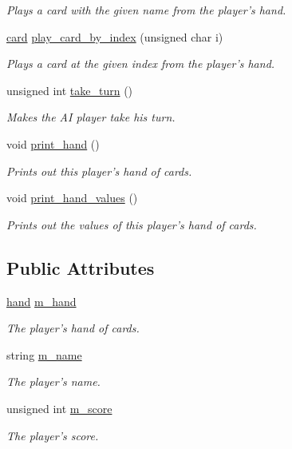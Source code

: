 \begin{DoxyCompactItemize}
\begin{DoxyCompactList}\small\item\em \-Plays a card with the given name from the player's hand. \end{DoxyCompactList}\item 
\hyperlink{uno__card_8h_ab16a632e2e3f1f154cce75648902eb83}{card} \hyperlink{class_uno___player_abe1a86f4792fa9e703ffeb28e453160f}{play\-\_\-card\-\_\-by\-\_\-index} (unsigned char i)
\begin{DoxyCompactList}\small\item\em \-Plays a card at the given index from the player's hand. \end{DoxyCompactList}\item 
unsigned int \hyperlink{class_uno___player_a31f9f272c9a427ea3b9e8dc7120fadac}{take\-\_\-turn} ()
\begin{DoxyCompactList}\small\item\em \-Makes the \-A\-I player take his turn. \end{DoxyCompactList}\item 
void \hyperlink{class_uno___player_a3af4557fcf900bc6357000449ecb5860}{print\-\_\-hand} ()
\begin{DoxyCompactList}\small\item\em \-Prints out this player's hand of cards. \end{DoxyCompactList}\item 
void \hyperlink{class_uno___player_a17a542fc645418ee806c79ebe253a62e}{print\-\_\-hand\-\_\-values} ()
\begin{DoxyCompactList}\small\item\em \-Prints out the values of this player's hand of cards. \end{DoxyCompactList}\end{DoxyCompactItemize}
\subsection*{\-Public \-Attributes}
\begin{DoxyCompactItemize}
\item 
\hyperlink{uno__player_8h_acd9523c15e47a87e3740cf5ade73556e}{hand} \hyperlink{class_uno___player_a9d50084b9fd4b005286ffdaa004f2664}{m\-\_\-hand}
\begin{DoxyCompactList}\small\item\em \-The player's hand of cards. \end{DoxyCompactList}\item 
string \hyperlink{class_uno___player_a06af109b4d621efa14ba98e4c9395739}{m\-\_\-name}
\begin{DoxyCompactList}\small\item\em \-The player's name. \end{DoxyCompactList}\item 
unsigned int \hyperlink{class_uno___player_a9805f306a500b1898c0a0922d76de444}{m\-\_\-score}
\begin{DoxyCompactList}\small\item\em \-The player's score. \end{DoxyCompactList}\end{DoxyCompactItemize}


